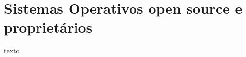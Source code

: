 \section{Sistemas Operativos open source e proprietários} \label{section: sistemas operativos}
texto